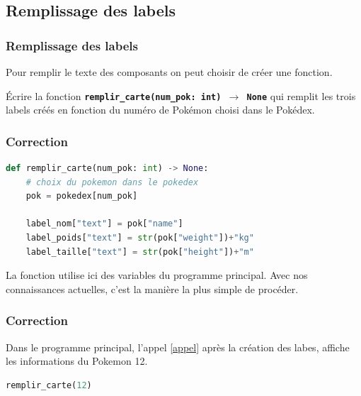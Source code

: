 \documentclass[svgnames,11pt]{beamer}
\begin{document}
\subsection{Remplissage des labels}
\begin{frame}
    \frametitle{Remplissage des labels}

    Pour remplir le texte des composants on peut choisir de créer une fonction.
    \begin{activite}
        Écrire la fonction \textbf{\texttt{remplir\_carte(num\_pok: int) $\rightarrow$ None}} qui remplit les trois labels créés en fonction du numéro de Pokémon choisi dans le Pokédex.
    \end{activite}

\end{frame}
\begin{frame}[fragile]
    \frametitle{Correction}
    \begin{center}
        \begin{lstlisting}[language=Python, basicstyle=\small]
def remplir_carte(num_pok: int) -> None:
    # choix du pokemon dans le pokedex
    pok = pokedex[num_pok]

    label_nom["text"] = pok["name"]
    label_poids["text"] = str(pok["weight"])+"kg"
    label_taille["text"] = str(pok["height"])+"m"
\end{lstlisting}
        \label{CODE}
    \end{center}

    \begin{aretenir}[Commentaire]
        La fonction utilise ici des variables du programme principal. Avec nos connaissances actuelles, c'est la manière la plus simple de procéder.
    \end{aretenir}
\end{frame}
\begin{frame}[fragile]
    \frametitle{Correction}

    Dans le programme principal, l'appel \ref{appel} après la création des labes, affiche les informations du Pokemon 12.

    \begin{center}
        \begin{lstlisting}[language=Python, basicstyle=\small]
remplir_carte(12)
\end{lstlisting}
        \label{appel}
    \end{center}

\end{frame}
\end{document}
